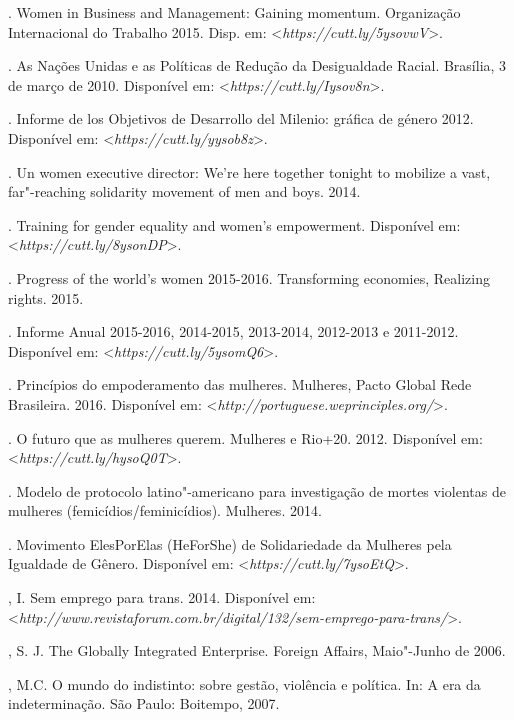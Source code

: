 \begin{bibliohedra}
. Women in Business and Management: Gaining momentum. Organização
Internacional do Trabalho 2015.
Disp. em: \textless{}\emph{https://cutt.ly/5ysovwV}\textgreater{}.

. As Nações Unidas e as Políticas de Redução da Desigualdade Racial.
Brasília, 3 de março de 2010.
Disponível em: \textless{}\emph{https://cutt.ly/Iysov8n}\textgreater{}.

. Informe de los Objetivos de Desarrollo del Milenio: gráfica
de género 2012.
Disponível em: \textless{}\emph{https://cutt.ly/yysob8z}\textgreater{}.

. Un women executive director: We're here together tonight to
mobilize a vast, far"-reaching solidarity movement of men and boys. 2014.

\titidem. Training for gender equality and women's empowerment.
Disponível em: \textless{}\emph{https://cutt.ly/8ysonDP}\textgreater{}.

\titidem. Progress of the world's women 2015-2016. Transforming
economies, Realizing rights. 2015.

. Informe Anual 2015-2016, 2014-2015, 2013-2014, 2012-2013 e
2011-2012. Disponível em: \textless{}\emph{https://cutt.ly/5ysomQ6}\textgreater{}.

\titidem. Princípios do empoderamento das mulheres.  Mulheres,
Pacto Global Rede Brasileira. 2016.
Disponível em: \textless{}\emph{http://portuguese.weprinciples.org/}\textgreater{}.

\titidem. O futuro que as mulheres querem.  Mulheres e Rio+20.
2012.
Disponível em: \textless{}\emph{https://cutt.ly/hysoQ0T}\textgreater{}.

\titidem. Modelo de protocolo latino"-americano para investigação de
mortes violentas de mulheres (femicídios/feminicídios).  Mulheres.
2014.

\titidem. Movimento ElesPorElas (HeForShe) de Solidariedade da 
Mulheres pela Igualdade de Gênero.
Disponível em: \textless{}\emph{https://cutt.ly/7ysoEtQ}\textgreater{}.

, I. Sem emprego para trans. 2014.
Disponível em: \textless{}\emph{http://www.revistaforum.com.br/digital/132/sem-emprego-para-trans/}\textgreater{}.

, S. J. The Globally Integrated Enterprise. Foreign Affairs,
Maio"-Junho de 2006.

, M.C. O mundo do indistinto: sobre gestão, violência e política.
In: A era da indeterminação. São Paulo: Boitempo, 2007.


\end{bibliohedra}
